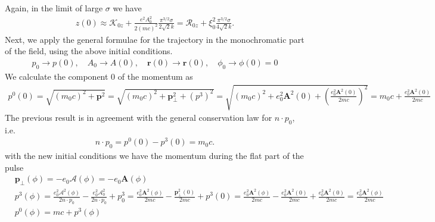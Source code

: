 Again, in the limit of large $\sigma$ we have
\begin{align}
  z(0) \approx \mathcal{K}_{0 z}+\frac{e^{2} A_{0}^{2}}{2(m c)^{2}} \frac{\pi^{3 / 2} \sigma}{2 \sqrt{2} k}=\mathcal{R}_{0 z}+\xi_{0}^{2} \frac{\pi^{3 / 2} \sigma}{4 \sqrt{2} k} . \label{II.2.4.10}
\end{align}
Next, we apply the general formulae for the trajectory in the monochromatic part of the field, using the above initial conditions.
\begin{align}
  p_{0} \rightarrow p(0), \quad A_{0} \rightarrow A(0), \quad \mathbf{r}(0) \rightarrow \mathbf{r}(0), \quad \phi_{0} \rightarrow \phi(0)=0 \label{II.2.4.11}
\end{align}
We calculate the component 0 of the momentum as
\begin{align}
  p^{0}(0)=\sqrt{\left(m_{0} c\right)^{2}+\mathbf{p}^{2}}=\sqrt{\left(m_{0} c\right)^{2}+\mathbf{p}_{\perp}^{2}+\left(p^{3}\right)^{2}}=\sqrt{\left(m_{0} c\right)^{2}+e_{0}^{2} \mathbf{A}^{2}(0)+\left(\frac{e_{0}^{2} \mathbf{A}^{2}(0)}{2 m c}\right)^{2}}=m_{0} c+\frac{e_{0}^{2} \mathbf{A}^{2}(0)}{2 m c} \label{II.2.4.12}
\end{align}
The previous result is in agreement with the general conservation law for $n \cdot p_{0}$, i.e.
\begin{align}
  n \cdot p_{0}=p^{0}(0)-p^{3}(0)=m_{0} c . \label{II.2.4.13}
\end{align}
with the new initial conditions we have the momentum during the flat part of the pulse
\begin{align}
   & \mathbf{p}_{\perp}(\phi)=-e_{0} \mathcal{A}(\phi)=-e_{0} \mathbf{A}(\phi)  \label{II.2.4.14}                                                                                                                                                                                                                                                                                                                                       \\
   & p^{3}(\phi)=\frac{e_{0}^{2} \mathcal{A}^{2}(\phi)}{2 n \cdot p_{0}}-\frac{e_{0}^{2} \mathcal{A}_{0}^{2}}{2 n \cdot p_{0}}+p_{0}^{3}=\frac{e_{0}^{2} \mathbf{A}^{2}(\phi)}{2 m c}-\frac{\mathbf{p}_{\perp}^{2}(0)}{2 m c}+p^{3}(0)=\frac{e_{0}^{2} \mathbf{A}^{2}(\phi)}{2 m c}-\frac{e_{0}^{2} \mathbf{A}^{2}(0)}{2 m c}+\frac{e_{0}^{2} \mathbf{A}^{2}(0)}{2 m c}=\frac{e_{0}^{2} \mathbf{A}^{2}(\phi)}{2 m c}  \label{II.2.4.15} \\
   & p^{0}(\phi)=m c+p^{3}(\phi) \label{II.2.4.16}                                                                                                                                                                                                                                                                                                                                                                                      \\
\end{align}
